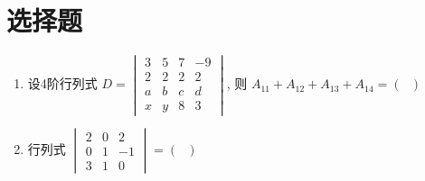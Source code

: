 \section{选择题}
\begin{enumerate}
	
	\item 设4阶行列式 $D = \begin{vmatrix} 3 & 5 & 7 & -9 \\ 2 & 2 & 2 & 2 \\ a & b & c & d \\ x & y & 8 & 3 \end{vmatrix}$, 则 $A_{11} + A_{12} + A_{13} + A_{14} = ( \ \ \ )$
	\vspace{0.5em}
	
	\item 行列式 $\begin{vmatrix} 2 & 0 & 2 \\ 0 & 1 & -1 \\ 3 & 1 & 0 \end{vmatrix} = ( \ \ \ )$
	\vspace{0.5em}
	

\end{enumerate}
